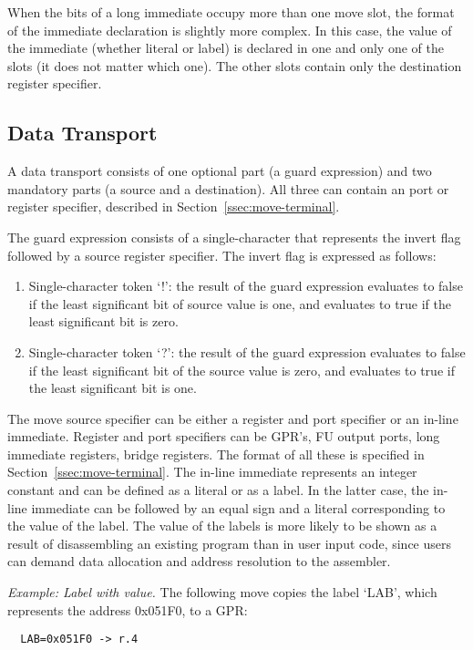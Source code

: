 \documentclass[twoside]{tceusermanual}
\begin{document}
When the bits of a long immediate occupy more than one move slot, the format
of the immediate declaration is slightly more complex.  In this case, the
value of the immediate (whether literal or label) is declared in one and
only one of the slots (it does not matter which one). The other slots
contain only the destination register specifier.

\subsection{Data Transport}

A data transport consists of one optional part (a guard expression) and two
mandatory parts (a source and a destination). All three can contain an port
or register specifier, described in Section~\ref{ssec:move-terminal}.

The guard expression consists of a single-character that represents the
invert flag followed by a source register specifier. The invert flag is
expressed as follows:
\begin{enumerate}
\item %
  Single-character token `!': the result of the guard expression evaluates
  to false if the least significant bit of source value is one, and evaluates
  to true if the least significant bit is zero.
\item %
  Single-character token `?': the result of the guard expression evaluates
  to false if the least significant bit of the source value is zero, and
  evaluates to true if the least significant bit is one.
\end{enumerate}

The move source specifier can be either a register and port specifier or an
in-line immediate. Register and port specifiers can be GPR's, FU output
ports, long immediate registers, bridge registers. The format of all these
is specified in Section~\ref{ssec:move-terminal}.
%
The in-line immediate represents an integer constant and can be defined as a
literal or as a label. In the latter case, the in-line immediate can be
followed by an equal sign and a literal corresponding to the value of the
label.  The value of the labels is more likely to be shown as a result of
disassembling an existing program than in user input code, since users can
demand data allocation and address resolution to the assembler.

\emph{Example: Label with value.}
%
The following move copies the label `LAB', which represents the address
0x051F0, to a GPR:
\begin{verbatim}
  LAB=0x051F0 -> r.4
\end{verbatim}
\end{document}
